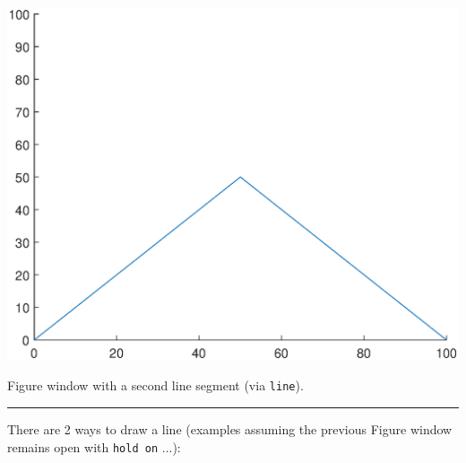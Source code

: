 \documentclass{tufte-book} %
\begin{document}
\begin{marginfigure}[-0.0in]
\includegraphics[width=\linewidth]{ch3-graphics03.eps}
\caption{Figure window with a second line segment (via \texttt{line}).}
\label{fig:ch3-graphics03}
\end{marginfigure}

\vspace{1mm}
\noindent\rule{4cm}{0.5pt}
\vspace{2mm}

\noindent There are 2 ways to draw a line (examples assuming the previous Figure window remains open with \texttt{hold on} ...):
\end{document}
